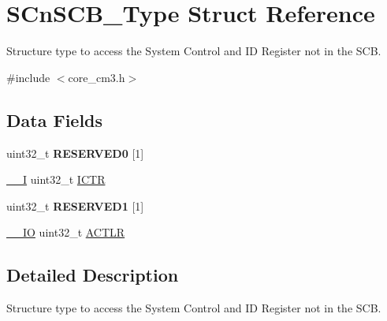\hypertarget{struct_s_cn_s_c_b___type}{\section{S\-Cn\-S\-C\-B\-\_\-\-Type Struct Reference}
\label{struct_s_cn_s_c_b___type}
}


Structure type to access the System Control and I\-D Register not in the S\-C\-B.  




{\ttfamily \#include $<$core\-\_\-cm3.\-h$>$}

\subsection*{Data Fields}
\begin{DoxyCompactItemize}
\item 
\hypertarget{struct_s_cn_s_c_b___type_a3bc109a372d05329e22cb7e3bf2b84ba}{uint32\-\_\-t {\bfseries R\-E\-S\-E\-R\-V\-E\-D0} \mbox{[}1\mbox{]}}\label{struct_s_cn_s_c_b___type_a3bc109a372d05329e22cb7e3bf2b84ba}

\item 
\hyperlink{group___c_m_s_i_s__core__definitions_gaf63697ed9952cc71e1225efe205f6cd3}{\-\_\-\-\_\-\-I} uint32\-\_\-t \hyperlink{struct_s_cn_s_c_b___type_a5bb2c6795b90f12077534825cc844b56}{I\-C\-T\-R}
\item 
\hypertarget{struct_s_cn_s_c_b___type_a3e94488b04b41e4c165bbfe6932f4a92}{uint32\-\_\-t {\bfseries R\-E\-S\-E\-R\-V\-E\-D1} \mbox{[}1\mbox{]}}\label{struct_s_cn_s_c_b___type_a3e94488b04b41e4c165bbfe6932f4a92}

\item 
\hyperlink{group___c_m_s_i_s__core__definitions_gaec43007d9998a0a0e01faede4133d6be}{\-\_\-\-\_\-\-I\-O} uint32\-\_\-t \hyperlink{struct_s_cn_s_c_b___type_a9a73f00a0223775caeb09c5c6abb3087}{A\-C\-T\-L\-R}
\end{DoxyCompactItemize}


\subsection{Detailed Description}
Structure type to access the System Control and I\-D Register not in the S\-C\-B. 

